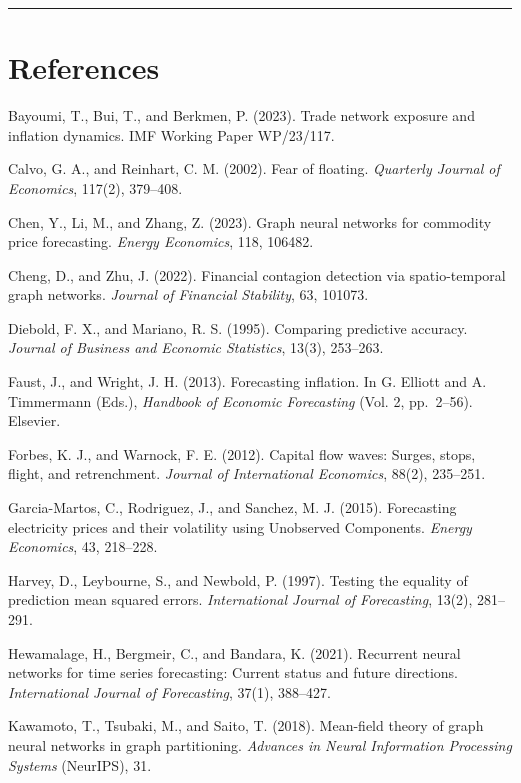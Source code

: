 \documentclass[
  11pt,
  a4paper]{article}
\begin{document}
\begin{center}\rule{0.5\linewidth}{0.5pt}\end{center}

\section{References}\label{references}

Bayoumi, T., Bui, T., and Berkmen, P. (2023). Trade network exposure and
inflation dynamics. IMF Working Paper WP/23/117.

Calvo, G. A., and Reinhart, C. M. (2002). Fear of floating.
\emph{Quarterly Journal of Economics}, 117(2), 379--408.

Chen, Y., Li, M., and Zhang, Z. (2023). Graph neural networks for
commodity price forecasting. \emph{Energy Economics}, 118, 106482.

Cheng, D., and Zhu, J. (2022). Financial contagion detection via
spatio-temporal graph networks. \emph{Journal of Financial Stability},
63, 101073.

Diebold, F. X., and Mariano, R. S. (1995). Comparing predictive
accuracy. \emph{Journal of Business and Economic Statistics}, 13(3),
253--263.

Faust, J., and Wright, J. H. (2013). Forecasting inflation. In G.
Elliott and A. Timmermann (Eds.), \emph{Handbook of Economic
Forecasting} (Vol. 2, pp.~2--56). Elsevier.

Forbes, K. J., and Warnock, F. E. (2012). Capital flow waves: Surges,
stops, flight, and retrenchment. \emph{Journal of International
Economics}, 88(2), 235--251.

Garcia-Martos, C., Rodriguez, J., and Sanchez, M. J. (2015). Forecasting
electricity prices and their volatility using Unobserved Components.
\emph{Energy Economics}, 43, 218--228.

Harvey, D., Leybourne, S., and Newbold, P. (1997). Testing the equality
of prediction mean squared errors. \emph{International Journal of
Forecasting}, 13(2), 281--291.

Hewamalage, H., Bergmeir, C., and Bandara, K. (2021). Recurrent neural
networks for time series forecasting: Current status and future
directions. \emph{International Journal of Forecasting}, 37(1),
388--427.

Kawamoto, T., Tsubaki, M., and Saito, T. (2018). Mean-field theory of
graph neural networks in graph partitioning. \emph{Advances in Neural
Information Processing Systems} (NeurIPS), 31.
\end{document}

